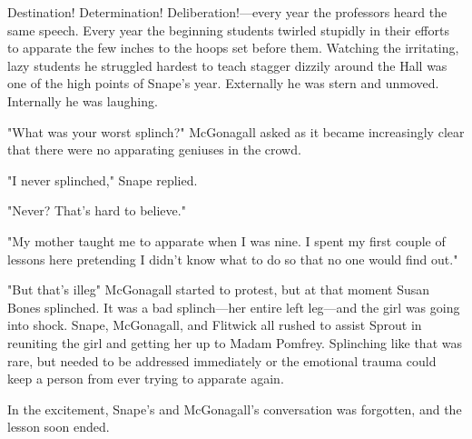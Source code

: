 Destination! Determination! Deliberation!—every year the professors heard the same speech. Every year the beginning students twirled stupidly in their efforts to apparate the few inches to the hoops set before them. Watching the irritating, lazy students he struggled hardest to teach stagger dizzily around the Hall was one of the high points of Snape's year. Externally he was stern and unmoved. Internally he was laughing.

"What was your worst splinch?" McGonagall asked as it became increasingly clear that there were no apparating geniuses in the crowd.

"I never splinched," Snape replied.

"Never? That's hard to believe."

"My mother taught me to apparate when I was nine. I spent my first couple of lessons here pretending I didn't know what to do so that no one would find out."

"But that's illeg{\el}" McGonagall started to protest, but at that moment Susan Bones splinched. It was a bad splinch—her entire left leg—and the girl was going into shock. Snape, McGonagall, and Flitwick all rushed to assist Sprout in reuniting the girl and getting her up to Madam Pomfrey. Splinching like that was rare, but needed to be addressed immediately or the emotional trauma could keep a person from ever trying to apparate again.

In the excitement, Snape's and McGonagall's conversation was forgotten, and the lesson soon ended.



